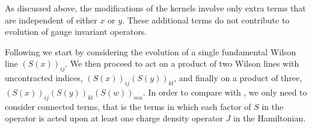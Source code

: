 \documentclass[11pt,a4paper]{article}
\begin{document}
As discussed above, the modifications of the kernels involve only extra terms  that are independent of either $x$ or $y$. These additional terms  do not contribute to evolution of 
gauge invariant operators.  

 Following \cite{BClast} we start by considering the evolution of a single fundamental Wilson line $(S(x))_{ij}$. We then proceed to act on a product of two Wilson lines with uncontracted indices, $(S(x))_{ij}(S(y))_{kl}$,
 and finally on a product of three, $(S(x))_{ij}(S(y))_{kl}(S(w))_{mn}$. In order to compare with \cite{BClast}, we only need to consider connected terms, that is the terms in which each factor of $S$ in the operator is acted upon at least one charge density operator $J$ in the Hamiltonian.


\end{document}
